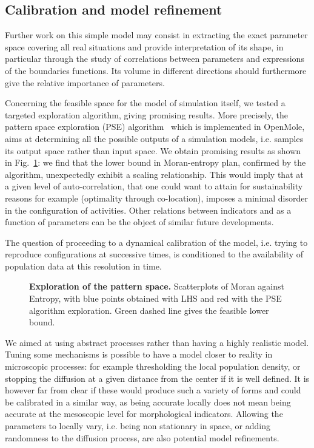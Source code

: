 \documentclass[10pt,letterpaper]{article}
\begin{document}
\subsection*{Calibration and model refinement}

Further work on this simple model may consist in extracting the exact parameter space covering all real situations and provide interpretation of its shape, in particular through the study of correlations between parameters and expressions of the boundaries functions. Its volume in different directions should furthermore give the relative importance of parameters. 

Concerning the feasible space for the model of simulation itself, we tested a targeted exploration algorithm, giving promising results. More precisely, the pattern space exploration (PSE) algorithm~\cite{10.1371/journal.pone.0138212} which is implemented in OpenMole, aims at determining all the possible outputs of a simulation models, i.e. samples its output space rather than input space. We obtain promising results as shown in Fig.~\ref{fig:fig7}: we find that the lower bound in Moran-entropy plan, confirmed by the algorithm, unexpectedly exhibit a scaling relationship. This would imply that at a given level of auto-correlation, that one could want to attain for sustainability reasons for example (optimality through co-location), imposes a minimal disorder in the configuration of activities. Other relations between indicators and as a function of parameters can be the object of similar future developments.

The question of proceeding to a dynamical calibration of the model, i.e. trying to reproduce configurations at successive times, is conditioned to the availability of population data at this resolution in time.


\begin{figure}[!h]
\caption{\textbf{Exploration of the pattern space.} Scatterplots of Moran against Entropy, with blue points obtained with LHS and red with the PSE algorithm exploration. Green dashed line gives the feasible lower bound.}
\label{fig:fig7}
\end{figure}


We aimed at using abstract processes rather than having a highly realistic model. Tuning some mechanisms is possible to have a model closer to reality in microscopic processes: for example thresholding the local population density, or stopping the diffusion at a given distance from the center if it is well defined. It is however far from clear if these would produce such a variety of forms and could be calibrated in a similar way, as being accurate locally does not mean being accurate at the mesoscopic level for morphological indicators. Allowing the parameters to locally vary, i.e. being non stationary in space, or adding randomness to the diffusion process, are also potential model refinements.
\end{document}
